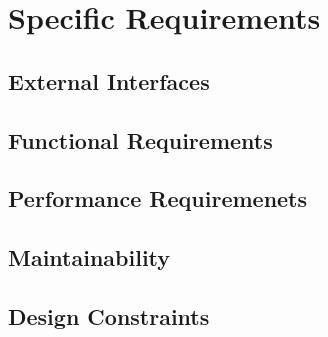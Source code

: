 \section{Specific Requirements}

\subsection{External Interfaces}
\subsection{Functional Requirements}
\subsection{Performance Requiremenets}
\subsection{Maintainability}
\subsection{Design Constraints}











